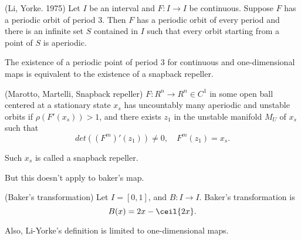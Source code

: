 \documentclass[11pt]{article}
\begin{document}
\begin{proposition}
  (Li, Yorke. 1975)
  Let $I$ be an interval and $F: I\to I$ be continuous. Suppose $F$ has a periodic orbit of period 3.
  Then $F$ has a periodic orbit of every period and there is an infinite set $S$ contained in
  $I$ such that every orbit starting from a point of $S$ is aperiodic.
\end{proposition}

The existence of a periodic point of period 3 for continuous and one-dimensional maps is
equivalent to the existence of a snapback repeller.
\begin{definition}
  (Marotto, Martelli, Snapback repeller)
 $F: R^n\to R^n \in C^1$ in some open ball centered at a stationary state $x_s$
has uncountably many aperiodic and unstable orbits if $\rho(F'(x_s)) > 1$, and
there exists $z_1$ in the unstable manifold $M_U$ of $x_s$ such that
\begin{equation*}
  det((F^m)'(z_1)) \neq 0, \quad F^m(z_1) = x_s.
\end{equation*}
 
  Such $x_s$ is called a snapback repeller.
\end{definition}

But this doesn't apply to baker's map.
\begin{definition}
  (Baker's transformation)
  Let $I = [0,1]$, and $B: I \to I$. Baker's transformation is
  \begin{equation*}
    B(x) = 2x - \ceil{2x}.
  \end{equation*}
  
\end{definition}

Also, Li-Yorke's definition is limited to one-dimensional maps.
\end{document}
